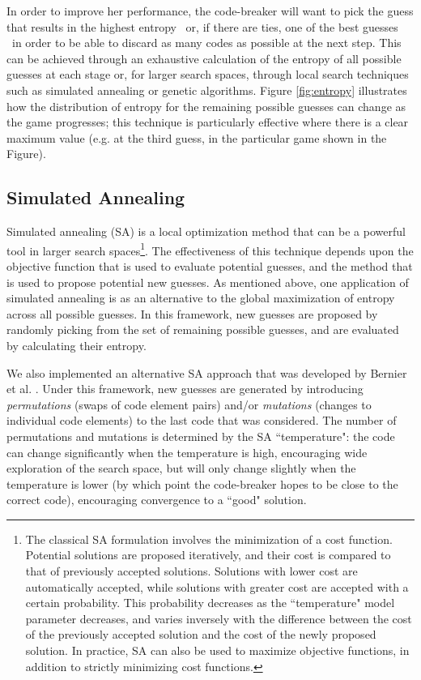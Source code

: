 \documentclass[11pt]{article}
\begin{document}
In order to improve her performance, the code-breaker will want to pick the guess that results in the highest entropy \textendash \ or, if there are ties, one of the best guesses \textendash \ in order to be able to discard as many codes as possible at the next step. This can be achieved through an exhaustive calculation of the entropy of all possible guesses at each stage or, for larger search spaces, through local search techniques such as simulated annealing or genetic algorithms.  Figure \ref{fig:entropy} illustrates how the distribution of entropy for the remaining possible guesses can change as the game progresses; this technique is particularly effective where there is a clear maximum value (e.g. at the third guess, in the particular game shown in the Figure).

\newpage

\subsection{Simulated Annealing}

Simulated annealing (SA) is a local optimization method that can be a powerful tool in larger search spaces\footnote{The classical SA formulation involves the minimization of a cost function. Potential solutions are proposed iteratively, and their cost is compared to that of previously accepted solutions. Solutions with lower cost are automatically accepted, while solutions with greater cost are accepted with a certain probability. This probability decreases as the ``temperature" model parameter decreases, and varies inversely with the difference between the cost of the previously accepted solution and the cost of the newly proposed solution. In practice, SA can also be used to maximize objective functions, in addition to strictly minimizing cost functions.}. The effectiveness of this technique depends upon the objective function that is used to evaluate potential guesses, and the method that is used to propose potential new guesses. As mentioned above, one application of simulated annealing is as an alternative to the global maximization of entropy across all possible guesses. In this framework, new guesses are proposed by randomly picking from the set of remaining possible guesses, and are evaluated by calculating their entropy.

We also implemented an alternative SA approach that was developed by Bernier et al. \cite{bernier1996solving}. Under this framework, new guesses are generated by introducing \textit{permutations} (swaps of code element pairs) and/or \textit{mutations} (changes to individual code elements) to the last code that was considered. The number of permutations and mutations is determined by the SA ``temperature": the code can change significantly when the temperature is high, encouraging wide exploration of the search space, but will only change slightly when the temperature is lower (by which point the code-breaker hopes to be close to the correct code), encouraging convergence to a ``good" solution.
\end{document}
